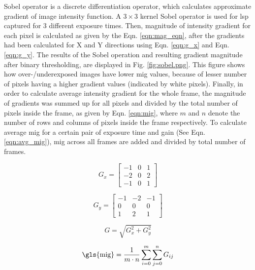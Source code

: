    \vspace{5mm}
    \noindent Sobel operator is a discrete differentiation operator, which calculates approximate gradient of image intensity function. A $3\times3$ kernel Sobel operator is used for \gls{lsp} captured for 3 different exposure times. Then, magnitude of intensity gradient for each pixel is calculated as given by the Eqn. \ref{eqn:mag_eqn}, after the gradients had been calculated for X and Y directions using Eqn. \ref{eqn:g_x} and Eqn. \ref{eqn:g_y}. The results of the Sobel operation and resulting gradient magnitude after binary thresholding, are displayed in Fig. \ref{fig:sobel.png}. This figure shows how over-/underexposed images have lower \gls{mig} values, because of lesser number of pixels having a higher gradient values (indicated by white pixels). Finally, in order to calculate average intensity gradient for the whole frame, the magnitude of gradients was summed up for all pixels and divided by the total number of pixels inside the frame, as given by Eqn. \ref{eqn:mig}, where $m$ and $n$ denote the number of rows and columns of pixels inside the frame respectively. To calculate average \gls{mig} for a certain pair of exposure time and gain (See Eqn. \ref{eqn:avg_mig}), \gls{mig} across all frames are added and divided by total number of frames. 

    \begin{equation}
        G_x = 
        \begin{bmatrix}
            -1 & 0 & 1 \\
            -2 & 0 & 2 \\
            -1 & 0 & 1 
        \end{bmatrix}
        \label{eqn:g_x}
    \end{equation}

    \begin{equation}
        G_y = 
        \begin{bmatrix}
            -1 & -2 & -1 \\
            0 & 0 & 0 \\
            1 & 2 & 1 
        \end{bmatrix}
        \label{eqn:g_y}
    \end{equation}

    \begin{equation}
        G = \sqrt{G_x^2 + G_y^2}
        \label{eqn:mag_eqn}
    \end{equation}

    \begin{equation}
        \text{\gls{mig}} = \frac{1}{m \cdot n} \sum_{i=0}^{m} \sum_{j=0}^{n} G_{ij}
        \label{eqn:mig}
    \end{equation}

